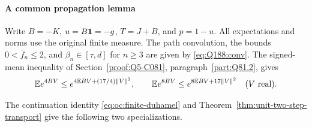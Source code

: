 \paragraph{A common propagation lemma}\label{part:R29.5}
Write \(B=-K\), \(u=B\mathbf1=-g\), \(T=J+B\), and
\(p=1-u\). All expectations and norms use the original finite measure.
The path convolution, the bounds \(0<\bar f_n\le2\), and
\(\beta_n\in[\tau,d]\) for \(n\ge3\) are given by
\eqref{eq:Q188:conv}. The signed-mean inequality of
Section~\ref{proof:Q5-C081}, paragraph~\ref{part:Q81.2}, gives
\begin{equation}\label{eq:oc:signed-moments}
 \mathbb E e^{4BV}\le e^{4\mathbb E BV+(17/4)\|V\|^2},\qquad
 \mathbb E e^{8BV}\le e^{8\mathbb E BV+17\|V\|^2}
 \quad(V\ \text{real}).
\end{equation}

The continuation identity \eqref{eq:oc:finite-duhamel} and
Theorem~\ref{thm:unit-two-step-transport} give the following two
specializations.

